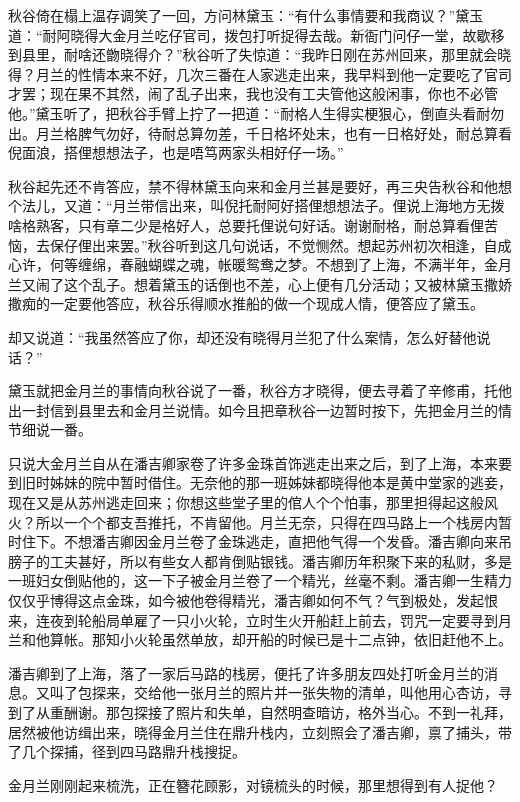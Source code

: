 \documentclass[12pt,UTF8]{ctexbook}
\begin{document}
{{{秋谷倚在榻上温存调笑了一回，方问林黛玉：“有什么事情要和我商议？”黛玉道：“耐阿晓得大金月兰吃仔官司，拨包打听捉得去哉。新衙门问仔一堂，故歇移到县里，耐啥还朆晓得介？”秋谷听了失惊道：“我昨日刚在苏州回来，那里就会晓得？月兰的性情本来不好，几次三番在人家逃走出来，我早料到他一定要吃了官司才罢；现在果不其然，闹了乱子出来，我也没有工夫管他这般闲事，你也不必管他。”黛玉听了，把秋谷手臂上拧了一把道：“耐格人生得实梗狠心，倒直头看耐勿出。月兰格脾气勿好，待耐总算勿差，千日格坏处末，也有一日格好处，耐总算看倪面浪，搭俚想想法子，也是唔笃两家头相好仔一场。”

秋谷起先还不肯答应，禁不得林黛玉向来和金月兰甚是要好，再三央告秋谷和他想个法儿，又道：“月兰带信出来，叫倪托耐阿好搭俚想想法子。俚说上海地方无拨啥格熟客，只有章二少是格好人，总要托俚说句好话。谢谢耐格，耐总算看俚苦恼，去保仔俚出来罢。”秋谷听到这几句说话，不觉恻然。想起苏州初次相逢，自成心许，何等缠绵，春融蝴蝶之魂，帐暖鸳鸯之梦。不想到了上海，不满半年，金月兰又闹了这个乱子。想着黛玉的话倒也不差，心上便有几分活动；又被林黛玉撒娇撒痴的一定要他答应，秋谷乐得顺水推船的做一个现成人情，便答应了黛玉。

却又说道：“我虽然答应了你，却还没有晓得月兰犯了什么案情，怎么好替他说话？”

黛玉就把金月兰的事情向秋谷说了一番，秋谷方才晓得，便去寻着了辛修甫，托他出一封信到县里去和金月兰说情。如今且把章秋谷一边暂时按下，先把金月兰的情节细说一番。

只说大金月兰自从在潘吉卿家卷了许多金珠首饰逃走出来之后，到了上海，本来要到旧时姊妹的院中暂时借住。无奈他的那一班姊妹都晓得他本是黄中堂家的逃妾，现在又是从苏州逃走回来；你想这些堂子里的倌人个个怕事，那里担得起这般风火？所以一个个都支吾推托，不肯留他。月兰无奈，只得在四马路上一个栈房内暂时住下。不想潘吉卿因金月兰卷了金珠逃走，直把他气得一个发昏。潘吉卿向来吊膀子的工夫甚好，所以有些女人都肯倒贴银钱。潘吉卿历年积聚下来的私财，多是一班妇女倒贴他的，这一下子被金月兰卷了一个精光，丝毫不剩。潘吉卿一生精力仅仅乎博得这点金珠，如今被他卷得精光，潘吉卿如何不气？气到极处，发起恨来，连夜到轮船局单雇了一只小火轮，立时生火开船赶上前去，罚咒一定要寻到月兰和他算帐。那知小火轮虽然单放，却开船的时候已是十二点钟，依旧赶他不上。

潘吉卿到了上海，落了一家后马路的栈房，便托了许多朋友四处打听金月兰的消息。又叫了包探来，交给他一张月兰的照片并一张失物的清单，叫他用心杏访，寻到了从重酬谢。那包探接了照片和失单，自然明查暗访，格外当心。不到一礼拜，居然被他访缉出来，晓得金月兰住在鼎升栈内，立刻照会了潘吉卿，禀了捕头，带了几个探捕，径到四马路鼎升栈搜捉。

金月兰刚刚起来梳洗，正在簪花顾影，对镜梳头的时候，那里想得到有人捉他？

}}}
\end{document}

